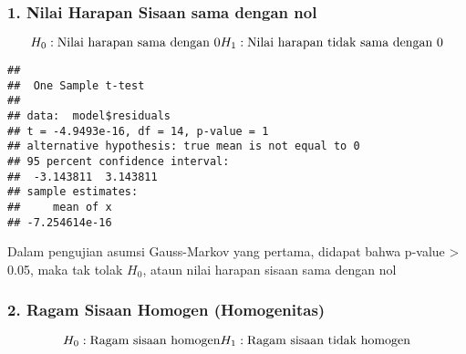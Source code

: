 \documentclass[
]{article}
\newenvironment{Shaded}{\begin{snugshade}}{\end{snugshade}}
\newcommand{\AttributeTok}[1]{\textcolor[rgb]{0.13,0.29,0.53}{#1}}
\newcommand{\DecValTok}[1]{\textcolor[rgb]{0.00,0.00,0.81}{#1}}
\newcommand{\FloatTok}[1]{\textcolor[rgb]{0.00,0.00,0.81}{#1}}
\newcommand{\FunctionTok}[1]{\textcolor[rgb]{0.13,0.29,0.53}{\textbf{#1}}}
\newcommand{\NormalTok}[1]{#1}
\newcommand{\OtherTok}[1]{\textcolor[rgb]{0.56,0.35,0.01}{#1}}
\newcommand{\SpecialCharTok}[1]{\textcolor[rgb]{0.81,0.36,0.00}{\textbf{#1}}}
\begin{document}
\hypertarget{nilai-harapan-sisaan-sama-dengan-nol}{%
\subsubsection{1. Nilai Harapan Sisaan sama dengan
nol}\label{nilai-harapan-sisaan-sama-dengan-nol}}

\[
H_0 : \text{Nilai harapan sama dengan 0}\\H_1 : \text{Nilai harapan tidak sama dengan 0}
\]

\begin{Shaded}
\end{Shaded}

\begin{verbatim}
## 
##  One Sample t-test
## 
## data:  model$residuals
## t = -4.9493e-16, df = 14, p-value = 1
## alternative hypothesis: true mean is not equal to 0
## 95 percent confidence interval:
##  -3.143811  3.143811
## sample estimates:
##     mean of x 
## -7.254614e-16
\end{verbatim}

Dalam pengujian asumsi Gauss-Markov yang pertama, didapat bahwa p-value
\textgreater{} 0.05, maka tak tolak \(H_0\), ataun nilai harapan sisaan
sama dengan nol

\hypertarget{ragam-sisaan-homogen-homogenitas}{%
\subsubsection{2. Ragam Sisaan Homogen
(Homogenitas)}\label{ragam-sisaan-homogen-homogenitas}}

\[
H_0 : \text{Ragam sisaan homogen}\\H_1 : \text{Ragam sisaan tidak homogen}
\]

\begin{Shaded}
\end{Shaded}
\end{document}
